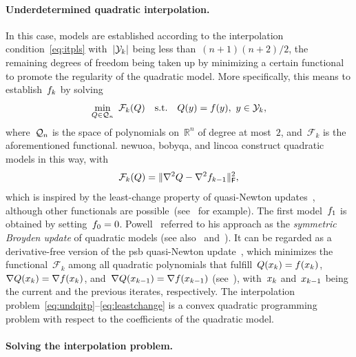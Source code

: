 \documentclass[
    smallextended,  %
    final,          %
]{svjour3}
\newcommand{\R}{\mathbb{R}}
\newcommand{\abs}[2][]{#1\lvert#2#1\rvert}
\newcommand{\frob}{\mathsf{F}}
\newcommand{\func}{\mathcal{F}}
\newcommand{\iter}[1][k]{x\ifthenelse{\equal{#1}{}}{}{_{#1}}}
\newcommand{\norm}[2][]{#1\lVert#2#1\rVert}
\newcommand{\objm}[1][k]{\obj\ifthenelse{\equal{#1}{}}{}{_{#1}}}
\newcommand{\obj}{f}
\newcommand{\qspace}[1][n]{\mathcal{Q}\ifthenelse{\equal{#1}{}}{}{_{#1}}}
\newcommand{\st}{\text{s.t.}}
\newcommand{\xpt}[1][k]{\mathcal{Y}\ifthenelse{\equal{#1}{}}{}{_{#1}}}
\begin{document}
\paragraph{\textnormal{\textbf{Underdetermined quadratic interpolation.}}}

In this case, models are established according to the interpolation condition~\eqref{eq:itpls}
with~$\abs{\xpt}$ being less than~$(n + 1)(n + 2) / 2$, the remaining degrees of freedom being taken up by minimizing a certain functional to promote the regularity of the quadratic model.
More specifically, this means to establish~$\objm$ by solving
\begin{equation}
    \label{eq:undqitp}
        \min_{Q \in \qspace}  ~ \func_k(Q) \quad \st \quad Q(y) = \obj(y), ~ y \in \xpt,
\end{equation}
where~$\qspace$ is the space of polynomials on~$\R^n$ of degree at most~$2$, and~$\func_k$ is the aforementioned functional.
\gls{newuoa}, \gls{bobyqa}, and \gls{lincoa} construct quadratic models in this way, with
\begin{equation}
    \label{eq:leastchange}
    \func_k(Q) = \norm{\nabla^2 Q - \nabla^2 \objm[k - 1]}_{\frob}^2,
\end{equation}
which is inspired by the least-change property of quasi-Newton updates~\cite{Dennis_Schnabel_1979}, although other functionals are possible~(see~\cite{Conn_Toint_1996,Bandeira_Scheinberg_Vicente_2012,Powell_2013,Zhang_2014} for example).
The first model~$\objm[1]$ is obtained by setting~$\objm[0] = 0$.
Powell~\cite{Powell_2013} referred to his approach as the \emph{symmetric Broyden update} of
quadratic models (see also~\cite[\S~3.6]{Zhang_2012} and~\cite[\S~2.4.2]{Ragonneau_2022}).
It can be regarded as a derivative-free version of the \gls{psb} quasi-Newton update~\cite{Powell_1970b}, which minimizes the functional~$\func_k$ among all quadratic polynomials that fulfill~$Q(\iter) = \obj(\iter)$, $\nabla Q(\iter) = \nabla \obj(\iter)$, and~$\nabla Q(\iter[k - 1]) = \nabla \obj(\iter[k - 1])$ (see~\cite[Theorem~4.2]{Dennis_Schnabel_1979}), with~$\iter$ and~$\iter[k - 1]$ being the current and the previous iterates, respectively.
The interpolation problem~\mbox{\eqref{eq:undqitp}--\eqref{eq:leastchange}} is a convex quadratic
programming problem with respect to the coefficients of the quadratic model.

\paragraph{\textnormal{\textbf{Solving the interpolation problem.}}}
\end{document}
